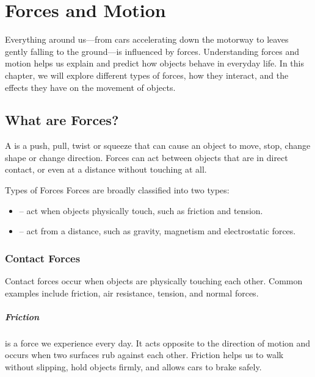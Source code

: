 \chapter{Forces and Motion}

Everything around us—from cars accelerating down the motorway to leaves gently falling to the ground—is influenced by forces. Understanding forces and motion helps us explain and predict how objects behave in everyday life. In this chapter, we will explore different types of forces, how they interact, and the effects they have on the movement of objects.

\section{What are Forces?}

A  is a push, pull, twist or squeeze that can cause an object to move, stop, change shape or change direction. Forces can act between objects that are in direct contact, or even at a distance without touching at all.

\begin{keyconcept}{Types of Forces}
Forces are broadly classified into two types:
\begin{itemize}
    \item {} – act when objects physically touch, such as friction and tension.
    \item {} – act from a distance, such as gravity, magnetism and electrostatic forces.
\end{itemize}
\end{keyconcept}

\subsection{Contact Forces}

Contact forces occur when objects are physically touching each other. Common examples include friction, air resistance, tension, and normal forces.


\paragraph{Friction} is a force we experience every day. It acts opposite to the direction of motion and occurs when two surfaces rub against each other. Friction helps us to walk without slipping, hold objects firmly, and allows cars to brake safely.


